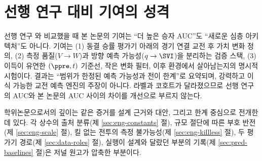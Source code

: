 \section{선행 연구 대비 기여의 성격}
\label{sec:disc-contribution}

선행 연구 \cite{baek2026killconditioned}와 비교했을 때 본 논문의 기여는 ``더 높은 승자 AUC''도 ``새로운 심층 아키텍처''도 아니다. 기여는 (1) 동결 승률 평가기 아래의 경기 연결 교전 후 가치 변화 정의, (2) 측정 품질($V \to W$)과 방향 예측 가능성($q \to \SVI$)을 분리하는 검증 스택, (3) 이득이 유연한 $(\ppre, t)$ 기준선, 작은 변화 필터, 이후 환경에서 살아남는지의 명시적 시험이다. 결과는 ``범위가 한정된 예측 가능성과 전이 한계''로 요약되며, 강력하고 이식 가능한 교전 예측 엔진의 주장이 아니다. 라벨과 코호트가 달라졌으므로 선행 연구의 AUC와 본 논문의 AUC 사이의 차이를 개선으로 부르지 않는다.

학위논문으로서의 깊이는 같은 증거를 설계 근거와 대안, 그리고 한계 중심으로 전개한 데 있다. 각 상수의 출처 분류(제 \ref{sec:eng-constants} 절), 규모 절단에 따른 부호 반전(제 \ref{sec:eng-scale} 절), 킬 없는 전투의 측정 불가능성(제 \ref{sec:eng-killless} 절), 두 평가기 경로(제 \ref{sec:data-roles} 절), 실행이 설계와 달랐던 부분의 기록(제 \ref{sec:pred-baselines} 절)은 저널 원고가 압축한 부분이다.
